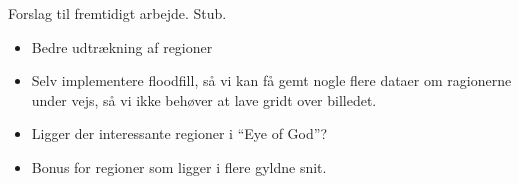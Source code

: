 {
{\sffamily Forslag til fremtidigt arbejde. Stub.
}

\begin{itemize}
    \item Bedre udtrækning af regioner
    \item Selv implementere floodfill, så vi kan få gemt nogle flere
    dataer om ragionerne under vejs, så vi ikke behøver at lave gridt
    over billedet.
    \item Ligger der interessante regioner i ``Eye of God''?
    \item Bonus for regioner som ligger i flere gyldne snit.
\end{itemize}

%
}

